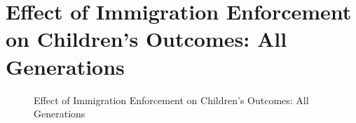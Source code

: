 \documentclass[12pt,english]{article}
\begin{document}
\begin{figure}[H]
\begin{subfigure}[b]{0.30\textwidth}
    \label{fig:third-gen-four}
  \end{subfigure}
  \hfill %
  \begin{subfigure}[b]{0.30\textwidth}
    \centering
    \label{fig:empty} %
  \end{subfigure}

\end{figure}

\pagebreak

\section{Effect of Immigration Enforcement on Children's Outcomes: All Generations}
\begin{figure}[H]
  \caption{Effect of Immigration Enforcement on Children's Outcomes: All Generations}
  \centering


\end{figure}
\end{document}
